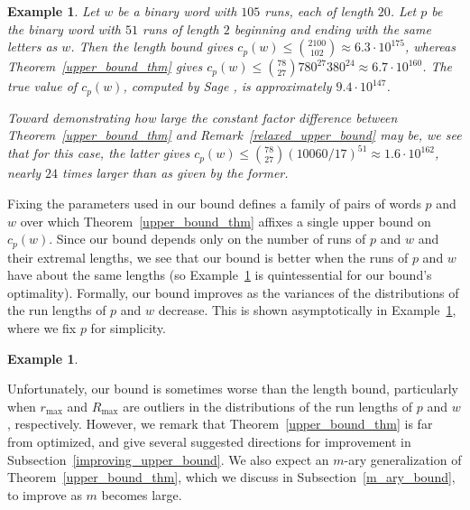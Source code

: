 \documentclass[11pt]{amsart}
\newtheorem{ex}[theorem]{Example}
\begin{document}
\begin{ex}\label{explicit_computation_bound}
    \normalfont Let $w$ be a binary word with $105$ runs, each of length $20$. Let $p$ be the binary word with $51$ runs of length $2$ beginning and ending with the same letters as $w$. Then the length bound gives $c_p(w)\leq {2100\choose 102}\approx6.3\cdot10^{175}$, whereas Theorem~\ref{upper_bound_thm} gives $c_p(w)\leq {78\choose27}780^{27}380^{24}\approx6.7\cdot10^{160}$. The true value of $c_p(w)$, computed by Sage \cite{sage}, is approximately $9.4\cdot10^{147}$. 
    
    Toward demonstrating how large the constant factor difference between Theorem~\ref{upper_bound_thm} and Remark~\ref{relaxed_upper_bound} may be, we see that for this case, the latter gives $c_p(w)\leq {78\choose 27}(10060/17)^{51}\approx 1.6\cdot10^{162}$, nearly $24$ times larger than as given by the former.
\end{ex}

Fixing the parameters used in our bound defines a family of pairs of words $p$ and $w$ over which Theorem~\ref{upper_bound_thm} affixes a single upper bound on $c_p(w)$. Since our bound depends only on the number of runs of $p$ and $w$ and their extremal lengths, we see that our bound is better when the runs of $p$ and $w$ have about the same lengths (so Example~\ref{explicit_computation_bound} is quintessential for our bound's optimality). Formally, our bound improves as the variances of the distributions of the run lengths of $p$ and $w$ decrease. This is shown asymptotically in Example~\ref{upper_bound_asymptotics}, where we fix $p$ for simplicity.
\begin{ex}\label{upper_bound_asymptotics}
\end{ex}

Unfortunately, our bound is sometimes worse than the length bound, particularly when $r_{\max}$ and $R_{\max}$ are outliers in the distributions of the run lengths of $p$ and $w$, respectively. However, we remark that Theorem~\ref{upper_bound_thm} is far from optimized, and give several suggested directions for improvement in Subsection~\ref{improving_upper_bound}. We also expect an $m$-ary generalization of Theorem~\ref{upper_bound_thm}, which we discuss in Subsection~\ref{m_ary_bound}, to improve as $m$ becomes large.
\end{document}

